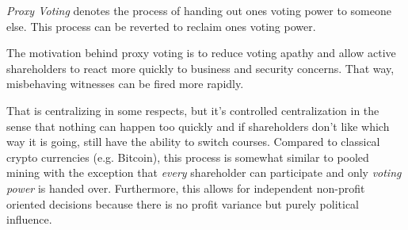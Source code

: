 \emph{Proxy Voting} denotes the process of handing out ones voting power to
someone else. This process can be reverted to reclaim ones voting power.

The motivation behind proxy voting is to reduce voting apathy and allow active
shareholders to react more quickly to business and security concerns. That way,
misbehaving witnesses can be fired more rapidly.

That is centralizing in some respects, but it's controlled centralization in
the sense that nothing can happen too quickly and if shareholders don't like
which way it is going, still have the ability to switch courses. Compared to
classical crypto currencies (e.g. Bitcoin), this process is somewhat similar to
pooled mining with the exception that \emph{every} shareholder can participate
and only \emph{voting power} is handed over. Furthermore, this allows for
independent non-profit oriented decisions because there is no profit variance
but purely political influence.
